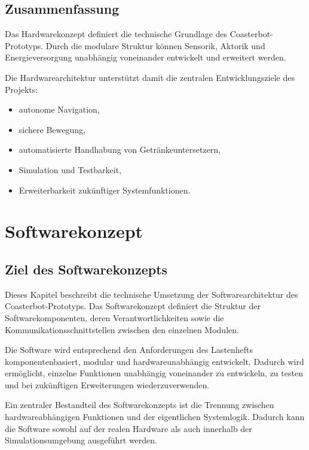 \subsection{Zusammenfassung}\label{zusammenfassung-1}

Das Hardwarekonzept definiert die technische Grundlage des
Coasterbot-Prototyps. Durch die modulare Struktur können Sensorik,
Aktorik und Energieversorgung unabhängig voneinander entwickelt und
erweitert werden.

Die Hardwarearchitektur unterstützt damit die zentralen
Entwicklungsziele des Projekts:

\begin{itemize}
\tightlist
\item
  autonome Navigation,
\item
  sichere Bewegung,
\item
  automatisierte Handhabung von Getränkeuntersetzern,
\item
  Simulation und Testbarkeit,
\item
  Erweiterbarkeit zukünftiger Systemfunktionen.
\end{itemize}

\section{Softwarekonzept}\label{softwarekonzept}

\subsection{Ziel des Softwarekonzepts}\label{ziel-des-softwarekonzepts}

Dieses Kapitel beschreibt die technische Umsetzung der
Softwarearchitektur des Coasterbot-Prototyps. Das Softwarekonzept
definiert die Struktur der Softwarekomponenten, deren
Verantwortlichkeiten sowie die Kommunikationsschnittstellen zwischen den
einzelnen Modulen.

Die Software wird entsprechend den Anforderungen des Lastenhefts
komponentenbasiert, modular und hardwareunabhängig entwickelt. Dadurch
wird ermöglicht, einzelne Funktionen unabhängig voneinander zu
entwickeln, zu testen und bei zukünftigen Erweiterungen
wiederzuverwenden.

Ein zentraler Bestandteil des Softwarekonzepts ist die Trennung zwischen
hardwareabhängigen Funktionen und der eigentlichen Systemlogik. Dadurch
kann die Software sowohl auf der realen Hardware als auch innerhalb der
Simulationsumgebung ausgeführt werden.

